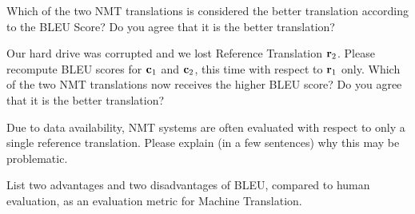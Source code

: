 \begin{parts}
\begin{subparts}
        Which of the two NMT translations is considered the better translation according to the BLEU Score? Do you agree that it is the better translation?
        
        
        \subpart[5] Our hard drive was corrupted and we lost Reference Translation $\mathbf{r}_2$. Please recompute BLEU scores for $\mathbf{c}_1$ and $\mathbf{c}_2$, this time with respect to $\mathbf{r}_1$ only. Which of the two NMT translations now receives the higher BLEU score? Do you agree that it is the better translation?

        
        \subpart[2] Due to data availability, NMT systems are often evaluated with respect to only a single reference translation. Please explain (in a few sentences) why this may be problematic.
        
        
        \subpart[2] List two advantages and two disadvantages of BLEU, compared to human evaluation, as an evaluation metric for Machine Translation. 
        
        
    \end{subparts}
\end{parts}
